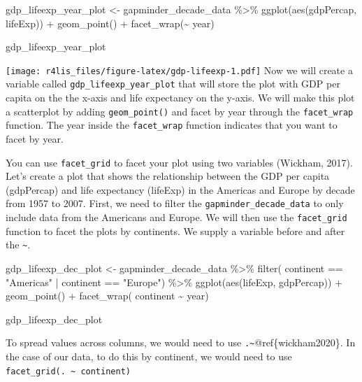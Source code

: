 \documentclass[
  krantz2]{krantz}
\makeatletter
\newenvironment{Shaded}{\begin{snugshade}}{\end{snugshade}}
\newcommand{\FunctionTok}[1]{\textcolor[rgb]{0,0,0}{#1}}
\newcommand{\NormalTok}[1]{#1}
\newcommand{\OtherTok}[1]{\textcolor[rgb]{0.37,0.37,0.37}{#1}}
\newcommand{\SpecialCharTok}[1]{\textcolor[rgb]{0,0,0}{#1}}
\newenvironment{kframe}{%
\medskip{}
\setlength{\fboxsep}{.8em}
 \def\at@end@of@kframe{}%
 \ifinner\ifhmode%
  \def\at@end@of@kframe{\end{minipage}}%
  \begin{minipage}{\columnwidth}%
 \fi\fi%
 \def\FrameCommand##1{\hskip\@totalleftmargin \hskip-\fboxsep
 \colorbox{shadecolor}{##1}\hskip-\fboxsep
     \hskip-\linewidth \hskip-\@totalleftmargin \hskip\columnwidth}%
 \MakeFramed {\advance\hsize-\width
   \@totalleftmargin\z@ \linewidth\hsize
   \@setminipage}}%
 {\par\unskip\endMakeFramed%
 \at@end@of@kframe}
\renewenvironment{Shaded}{\begin{kframe}}{\end{kframe}}
\makeatother
\begin{document}
\begin{Shaded}
\begin{Highlighting}[]
\NormalTok{gdp\_lifeexp\_year\_plot }\OtherTok{\textless{}{-}}\NormalTok{ gapminder\_decade\_data }\SpecialCharTok{\%\textgreater{}\%}
  \FunctionTok{ggplot}\NormalTok{(}\FunctionTok{aes}\NormalTok{(gdpPercap, lifeExp)) }\SpecialCharTok{+}
  \FunctionTok{geom\_point}\NormalTok{() }\SpecialCharTok{+}
  \FunctionTok{facet\_wrap}\NormalTok{(}\SpecialCharTok{\textasciitilde{}}\NormalTok{ year)}

\NormalTok{gdp\_lifeexp\_year\_plot}
\end{Highlighting}
\end{Shaded}

\texttt{[image: r4lis\_files/figure-latex/gdp-lifeexp-1.pdf]}
Now we will create a variable called \texttt{gdp\_lifeexp\_year\_plot} that will store the plot with GDP per capita on the the x-axis and life expectancy on the y-axis. We will make this plot a scatterplot by adding \texttt{geom\_point()} and facet by year through the \texttt{facet\_wrap} function. The year inside the \texttt{facet\_wrap} function indicates that you want to facet by year.

You can use \texttt{facet\_grid} to facet your plot using two variables (Wickham, 2017). Let's create a plot that shows the relationship between the GDP per capita (gdpPercap) and life expectancy (lifeExp) in the Americas and Europe by decade from 1957 to 2007. First, we need to filter the \texttt{gapminder\_decade\_data} to only include data from the Americans and Europe. We will then use the \texttt{facet\_grid} function to facet the plots by continents. We supply a variable before and after the \texttt{\textasciitilde{}}.

\begin{Shaded}
\begin{Highlighting}[]
\NormalTok{gdp\_lifeexp\_dec\_plot \textless{}{-} gapminder\_decade\_data \%\textgreater{}\%}
\NormalTok{  filter( continent == "Americas" | continent == "Europe") \%\textgreater{}\%}
\NormalTok{  ggplot(aes(lifeExp, gdpPercap)) +}
\NormalTok{  geom\_point() +}
\NormalTok{  facet\_wrap( continent \textasciitilde{} year)}

\NormalTok{gdp\_lifeexp\_dec\_plot}
\end{Highlighting}
\end{Shaded}

To spread values across columns, we would need to use \texttt{.\textasciitilde{}}@ref\{wickham2020\}. In the case of our data, to do this by continent, we would need to use \texttt{facet\_grid(.\ \textasciitilde{}\ continent)}
\end{document}
